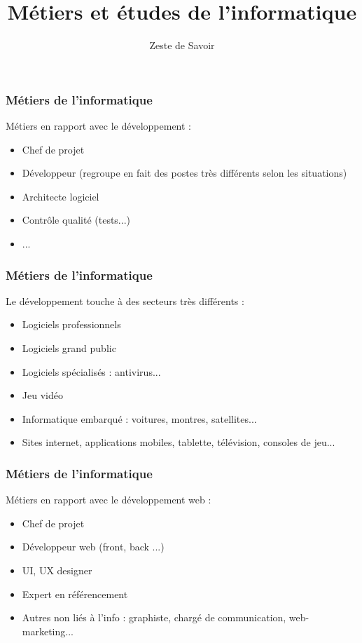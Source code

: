 \documentclass{beamer}
\title{Métiers et études de l'informatique}
\author{Zeste de Savoir}
\begin{document}
\begin{frame}
  \titlepage
\end{frame}

\begin{frame}
    \frametitle{Métiers de l'informatique}
    Métiers en rapport avec le développement :
        \begin{itemize}
            \item Chef de projet
            \item Développeur (regroupe en fait des postes très différents selon les situations)
            \item Architecte logiciel
            \item Contrôle qualité (tests...)
            \item ...
        \end{itemize}
\end{frame}

\begin{frame}
    \frametitle{Métiers de l'informatique}
    Le développement touche à des secteurs très différents :
        \begin{itemize}
            \item Logiciels professionnels
            \item Logiciels grand public
            \item Logiciels spécialisés : antivirus...
            \item Jeu vidéo
            \item Informatique embarqué : voitures, montres, satellites...
            \item Sites internet, applications mobiles, tablette, télévision, consoles de jeu...
        \end{itemize}
\end{frame}

\begin{frame}
    \frametitle{Métiers de l'informatique}
    Métiers en rapport avec le développement web :
        \begin{itemize}
            \item Chef de projet
            \item Développeur web (front, back ...)
            \item UI, UX designer
            \item Expert en référencement
            \item Autres non liés à l'info : graphiste, chargé de communication, web-marketing...
        \end{itemize}
\end{frame}
\end{document}
